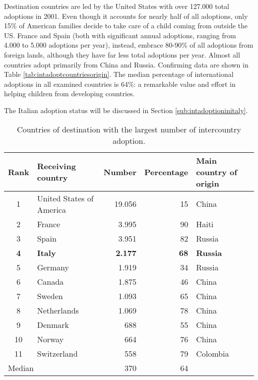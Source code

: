 Destination countries are led by the United States with over 127.000 total adoptions in 2001. Even though it accounts for nearly half of all adoptions, only 15\% of American families decide to take care of a child coming from outside the US. France and Spain (both with significant annual adoptions, ranging from 4.000 to 5.000 adoptions per year), instead, embrace 80-90\% of all adoptions from foreign lands, although they have far less total adoptions per year. Almost all countries adopt primarily from China and Russia. Confirming data are shown in Table \ref{tab:intadoptcountriesorigin}. The median percentage of international adoptions in all examined countries is 64\%: a remarkable value and effort in helping children from developing countries.

The Italian adoption status will be discussed in Section \ref{sub:intadoptioninitaly}.

\begin{table}[H]
   \centering
   \begin{tabular}{c l r r l}
      Rank & Receiving country\footnotemark[1] & Number & Percentage & Main country of origin\\
      \hline
      1 & United States of America & 19.056 & 15 & China\\
      2 & France & 3.995 & 90 & Haiti\\
      3 & Spain & 3.951 & 82 & Russia\\
      \textcolor{BrickRed}{\textbf{4}} & \textcolor{BrickRed}{\textbf{Italy}} & \textcolor{BrickRed}{\textbf{2.177}} & \textcolor{BrickRed}{\textbf{68}} & \textcolor{BrickRed}{\textbf{Russia}}\\
      5 & Germany & 1.919 & 34 & Russia\\
      6 & Canada & 1.875 & 46 & China\\
      7 & Sweden & 1.093 & 65 & China\\
      8 & Netherlands & 1.069 & 78 & China\\
      9 & Denmark & 688 & 55 & China\\
      10 & Norway & 664 & 76 & China\\
      11 & Switzerland & 558 & 79 & Colombia\\
      \hline
      \multicolumn{2}{l}{Median} & 370 & 64 &\\
   \end{tabular}
   \caption{Countries of destination with the largest number of intercountry adoption.}
    \label{tab:intadoptcountriesdestination}
\end{table}

